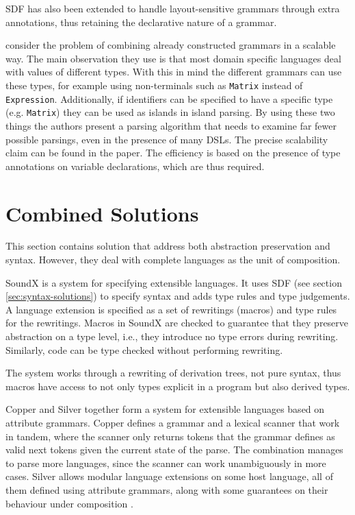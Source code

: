 \documentclass{kththesis}
\begin{document}
SDF has also been extended \cite{Erdweg2013Layout-sensitiv} to handle layout-sensitive grammars through extra annotations, thus retaining the declarative nature of a grammar.

\textcite{Silkensen2013Well-Typed-Isla} consider the problem of combining already constructed grammars in a scalable way. The main observation they use is that most domain specific languages deal with values of different types. With this in mind the different grammars can use these types, for example using non-terminals such as \texttt{Matrix} instead of \texttt{Expression}. Additionally, if identifiers can be specified to have a specific type (e.g. \texttt{Matrix}) they can be used as islands in island parsing. By using these two things the authors present a parsing algorithm that needs to examine far fewer possible parsings, even in the presence of many DSLs. The precise scalability claim can be found in the paper. The efficiency is based on the presence of type annotations on variable declarations, which are thus required.

\section{Combined Solutions} \label{sec:full-solutions}

This section contains solution that address both abstraction preservation and syntax. However, they deal with complete languages as the unit of composition.

SoundX \cite{Lorenzen2016Sound-type-depe} is a system for specifying extensible languages. It uses SDF (see section \ref{sec:syntax-solutions}) to specify syntax and adds type rules and type judgements. A language extension is specified as a set of rewritings (macros) and type rules for the rewritings. Macros in SoundX are checked to guarantee that they preserve abstraction on a type level, i.e., they introduce no type errors during rewriting. Similarly, code can be type checked without performing rewriting.

The system works through a rewriting of derivation trees, not pure syntax, thus macros have access to not only types explicit in a program but also derived types.

Copper \cite{Van-Wyk2007Context-aware-s} and Silver \cite{Van-Wyk2010Silver:-An-exte} together form a system for extensible languages based on attribute grammars. Copper defines a grammar and a lexical scanner that work in tandem, where the scanner only returns tokens that the grammar defines as valid next tokens given the current state of the parse. The combination manages to parse more languages, since the scanner can work unambiguously in more cases. Silver allows modular language extensions on some host language, all of them defined using attribute grammars, along with some guarantees on their behaviour under composition \cite{Kaminski2017Reliably-compos}.
\end{document}
